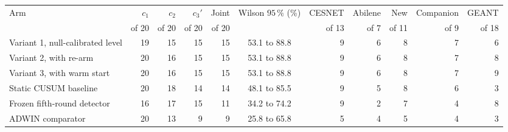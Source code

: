 {\footnotesize\setlength{\tabcolsep}{3pt}
\begin{tabular}{@{}p{3.3cm}rrrrcrrrrr@{}}
\toprule
Arm & $c_1$ & $c_2$ & $c_3'$ & Joint & Wilson $95\,\%$ (\%) & CESNET & Abilene & New & Companion & GEANT \\
 & of 20 & of 20 & of 20 & of 20 & & of 13 & of 7 & of 11 & of 9 & of 18 \\
\midrule
Variant 1, null-calibrated level & 19 & 15 & 15 & 15 & 53.1 to 88.8 & 9 & 6 & 8 & 7 & 6 \\
Variant 2, with re-arm & 20 & 16 & 15 & 15 & 53.1 to 88.8 & 9 & 6 & 8 & 7 & 8 \\
Variant 3, with warm start & 20 & 16 & 15 & 15 & 53.1 to 88.8 & 9 & 6 & 8 & 7 & 9 \\
Static CUSUM baseline & 20 & 18 & 14 & 14 & 48.1 to 85.5 & 9 & 5 & 8 & 6 & 3 \\
Frozen fifth-round detector & 16 & 17 & 15 & 11 & 34.2 to 74.2 & 9 & 2 & 7 & 4 & 8 \\
ADWIN comparator & 20 & 13 & 9 & 9 & 25.8 to 65.8 & 5 & 4 & 5 & 4 & 3 \\
\bottomrule
\end{tabular}
}
